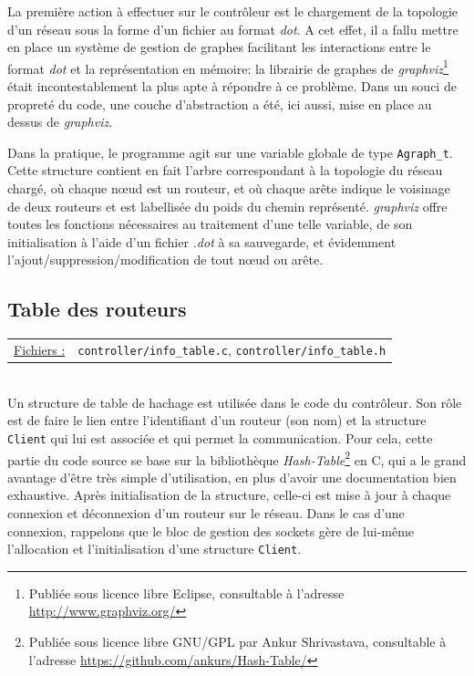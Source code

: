 \documentclass[a4paper,11pt]{article}
\begin{document}
La première action à effectuer sur le contrôleur est le chargement de la topologie d'un réseau sous la forme d'un fichier au format \textit{dot}. A cet effet, il a fallu mettre en place un système de gestion de graphes facilitant les interactions entre le format \textit{dot} et la représentation en mémoire: la librairie de graphes de \textit{graphviz}\footnote{Publiée sous licence libre Eclipse, consultable à l'adresse \url{http://www.graphviz.org/}} était incontestablement la plus apte à répondre à ce problème. Dans un souci de propreté du code, une couche d'abstraction a été, ici aussi, mise en place au dessus de \textit{graphviz}.

Dans la pratique, le programme agit sur une variable globale de type \texttt{Agraph\_t}. Cette structure contient en fait l'arbre correspondant à la topologie du réseau chargé, où chaque n\oe ud est un routeur, et où chaque arête indique le voisinage de deux routeurs et est labellisée du poids du chemin représenté. \textit{graphviz} offre toutes les fonctions nécessaires au traitement d'une telle variable, de son initialisation à l'aide d'un fichier \textit{.dot} à sa sauvegarde, et évidemment l'ajout/suppression/modification de tout n\oe ud ou arête.

\subsection{Table des routeurs}

\begin{tabularx}{\linewidth}{lX}
\underline{Fichiers :} & \texttt{controller/info\_table.c}, \texttt{controller/info\_table.h}\\
\end{tabularx}\\

Un structure de table de hachage est utilisée dans le code du contrôleur. Son rôle est de faire le lien entre l'identifiant d'un routeur (son nom) et la structure \texttt{Client} qui lui est associée et qui permet la communication. Pour cela, cette partie du code source se base sur la bibliothèque \textit{Hash-Table}\footnote{Publiée sous licence libre GNU/GPL par Ankur Shrivastava, consultable à l'adresse \url{https://github.com/ankurs/Hash-Table/}} en C, qui a le grand avantage d'être très simple d'utilisation, en plus d'avoir une documentation bien exhaustive. Après initialisation de la structure, celle-ci est mise à jour à chaque connexion et déconnexion d'un routeur sur le réseau. Dans le cas d'une connexion, rappelons que le bloc de gestion des sockets gère de lui-même l'allocation et l'initialisation d'une structure \texttt{Client}.
\end{document}
